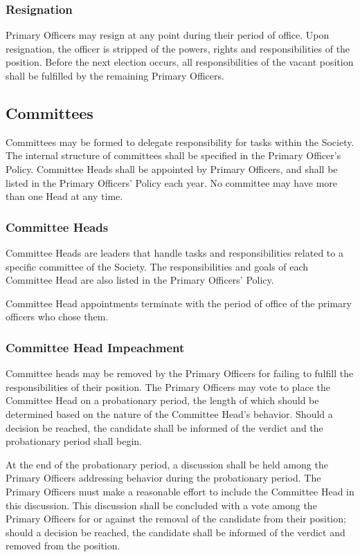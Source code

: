 \documentclass[american]{article}
\begin{document}
\subsubsection{Resignation}
Primary Officers may resign at any point during their period of office. Upon resignation, the officer is stripped of the powers, rights and responsibilities of the position. Before the next election occurs, all responsibilities of the vacant position shall be fulfilled by the remaining Primary Officers. 

\subsection{Committees}

Committees may be formed to delegate responsibility for tasks within the Society. The internal structure of committees shall be specified in the Primary Officer's Policy. Committee Heads shall be appointed by Primary Officers, and shall be listed in the Primary Officers' Policy each year. No committee may have more than one Head at any time.

\subsubsection{Committee Heads}
Committee Heads are leaders that handle tasks and responsibilities related to a specific committee of the Society. The responsibilities and goals of each Committee Head are also listed in the Primary Officers' Policy.

Committee Head appointments terminate with the period of office of the primary officers who chose them.

\subsubsection{Committee Head Impeachment}
Committee heads may be removed by the Primary Officers for failing to fulfill the responsibilities of their position. The Primary Officers may vote to place the Committee Head on a probationary period, the length of which should be determined based on the nature of the Committee Head's behavior. Should a decision be reached, the candidate shall be informed of the verdict and the probationary period shall begin.

At the end of the probationary period, a discussion shall be held among the Primary Officers addressing behavior during the probationary period. The Primary Officers must make a reasonable effort to include the Committee Head in this discussion. This discussion shall be concluded with a vote among the Primary Officers for or against the removal of the candidate from their position; should a decision be reached, the candidate shall be informed of the verdict and removed from the position.
\end{document}
